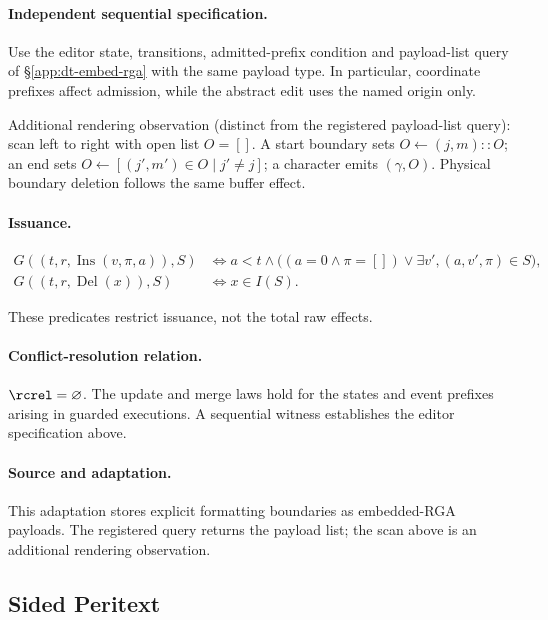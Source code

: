 \paragraph{Independent sequential specification.}
Use the editor state, transitions, admitted-prefix condition and payload-list
query of \S\ref{app:dt-embed-rga} with the same payload type. In particular,
coordinate prefixes affect admission, while the abstract edit uses the
named origin only.

Additional rendering observation (distinct from the registered payload-list query): scan left to right with open list $O=[]$. A start boundary sets $O\leftarrow(j,m)::O$; an end sets $O\leftarrow[(j',m')\in O\mid j'\ne j]$; a character emits $(\gamma,O)$. Physical boundary deletion follows the same buffer effect.


\paragraph{Issuance.}
\[
\begin{aligned}G((t,r,\operatorname{Ins}(v,\pi,a)),S)&\iff a<t\land\big((a=0\land\pi=[])\lor\exists v',(a,v',\pi)\in S\big),\\G((t,r,\operatorname{Del}(x)),S)&\iff x\in I(S).\end{aligned}
\]


These predicates restrict issuance, not the total raw effects.


\paragraph{Conflict-resolution relation.}
$\rcrel=\varnothing$. The update and merge laws hold for the states and event prefixes arising in guarded executions. A sequential witness establishes the editor specification above.


\paragraph{Source and adaptation.}
This adaptation stores explicit formatting boundaries as embedded-RGA payloads. The registered query returns the payload list; the scan above is an additional rendering observation.


\subsection{Sided Peritext}
\label{app:dt-sided-peritext-rich-core}

